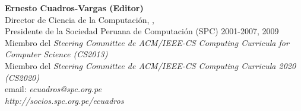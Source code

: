 \begin{center}
\textbf{Ernesto Cuadros-Vargas (Editor)}\\ 
Director de Ciencia de la Computación, \University, \city\\
Presidente de la Sociedad Peruana de Computación (SPC) 2001-2007, 2009\\
Miembro del {\it Steering Committee de ACM/IEEE-CS Computing Curricula for Computer Science (CS2013)}\\
Miembro del {\it Steering Committee de ACM/IEEE-CS Computing Curricula 2020 (CS2020)}\\
email: \textit{ecuadros@spc.org.pe}\\
\textit{http://socios.spc.org.pe/ecuadros}
\end{center}

